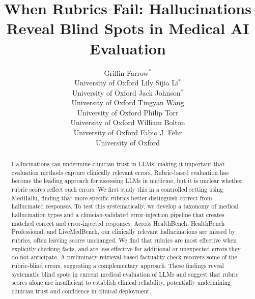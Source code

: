 \documentclass{article}
\title{When Rubrics Fail: Hallucinations Reveal Blind Spots in Medical AI Evaluation}
\author{
Griffin Farrow$^{*}$ \\
University of Oxford
\And
Lily Sijia Li$^{*}$ \\
University of Oxford
\And
Jack Johnson$^{*}$ \\
University of Oxford
\AND
Tingyan Wang \\
University of Oxford
\And
Philip Torr \\
University of Oxford
\And
William Bolton \\
University of Oxford
\And
Fabio J. Fehr \\
University of Oxford
}
\begin{document}
\maketitle

\vspace{-1.5em}
\begin{abstract}
Hallucinations can undermine clinician trust in LLMs, making it important that evaluation methods capture clinically relevant errors. Rubric-based evaluation has become the leading approach for assessing LLMs in medicine, but it is unclear whether rubric scores reflect such errors. We first study this in a controlled setting using MedHallu, finding that more specific rubrics better distinguish correct from hallucinated responses. To test this systematically, we develop a taxonomy of medical hallucination types and a clinician-validated error-injection pipeline that creates matched correct and error-injected responses. Across HealthBench, HealthBench Professional, and LiveMedBench, our clinically relevant hallucinations are missed by rubrics, often leaving scores unchanged.  We find that rubrics are most effective when explicitly checking facts, and are less effective for additional or unexpected errors they do not anticipate. A preliminary retrieval-based factuality check recovers some of the rubric-blind errors, suggesting a complementary approach. These findings reveal systematic blind spots in current medical evaluation of LLMs and suggest that rubric scores alone are insufficient to establish clinical reliability, potentially undermining clinician trust and confidence in clinical deployment.

\end{abstract}
\end{document}
